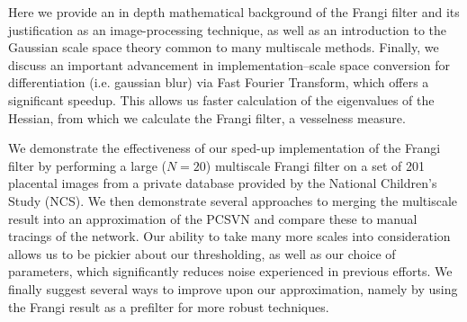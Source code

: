 Here we provide an in depth mathematical background of the Frangi filter and
its justification as an image-processing technique, as well as an introduction
to the Gaussian scale space theory common to many multiscale methods. Finally,
we discuss an important advancement in implementation--scale space conversion
for differentiation (i.e. gaussian blur) via Fast Fourier Transform, which
offers a significant speedup. This allows us faster calculation of the
eigenvalues of the Hessian, from which we calculate the Frangi filter, a
vesselness measure.

We demonstrate the effectiveness of our sped-up implementation of the Frangi
filter by performing a large ($N=20$) multiscale Frangi filter on a set of 201
placental images from a private database provided by the National Children's
Study (NCS). We then demonstrate several approaches to merging the multiscale
result into an approximation of the PCSVN and compare these to manual tracings
of the network. Our ability to take many more scales into consideration allows
us to be pickier about our thresholding, as well as our choice of parameters,
which significantly reduces noise
experienced in previous efforts. We finally suggest several ways to improve
upon our approximation, namely by using the Frangi result as a prefilter for
more robust techniques.